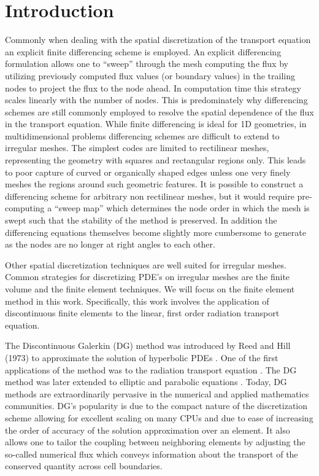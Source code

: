 \section{Introduction}

Commonly when dealing with the spatial discretization of the transport equation
an explicit finite differencing scheme is employed. An explicit differencing
formulation allows one to ``sweep'' through the mesh computing the flux by utilizing
previously computed flux values (or boundary values) in the trailing nodes to
project the flux to the node ahead.  In computation time this strategy scales
linearly with the number of nodes. This is predominately why differencing
schemes are still commonly employed to resolve the spatial dependence of the
flux in the transport equation. While finite differencing is ideal for 1D
geometries, in multidimensional problems differencing schemes are difficult to
extend to irregular meshes. The simplest codes are limited to rectilinear
meshes, representing the geometry with squares and rectangular regions only.
This leads to poor capture of curved or organically shaped edges unless one
very finely meshes the regions around such geometric features. It is possible
to construct a differencing scheme for arbitrary non rectilinear meshes, but it
would require pre-computing a “sweep map” which determines the node order in
which the mesh is swept such that the stability of the method is preserved. In
addition the differencing equations themselves become slightly more cumbersome
to generate as the nodes are no longer at right angles to each other.

Other spatial discretization techniques are well suited for irregular meshes. Common
strategies for discretizing PDE’s on irregular meshes are the finite volume and
the finite element techniques. We will focus on the finite element method in
this work. Specifically, this work involves the application of discontinuous
finite elements to the linear, first order radiation transport equation.

The Discontinuous Galerkin (DG) method was introduced by Reed and Hill (1973)
to approximate the solution of hyperbolic PDEs \cite{lesaint}. One of the first applications of the
method was to the radiation transport equation \cite{reed}. The
DG method was later extended to elliptic and parabolic equations \cite{riviere}.  Today,
DG methods are extraordinarily pervasive in the numerical and applied mathematics
communities.  DG's popularity is due to the compact nature of the discretization scheme allowing for excellent
scaling on many CPUs and due to ease of increasing the order of accuracy of the
solution approximation over an element.  It also allows one to tailor the coupling between
neighboring elements by adjusting the so-called numerical flux which conveys information
about the transport of the conserved quantity across cell boundaries.

